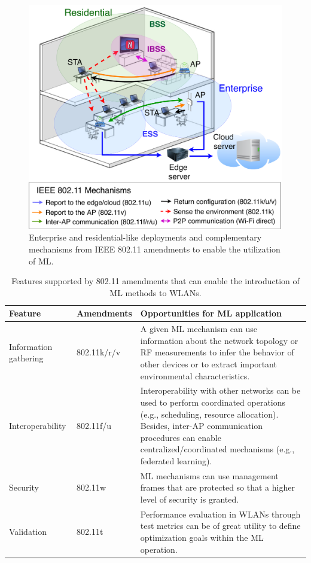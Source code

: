 \documentclass[journal]{IEEEtran}
\begin{document}
\begin{figure}[ht!]
	\centering
	\includegraphics[width=\columnwidth]{overview_learning_approaches}
	\caption{Enterprise and residential-like deployments and complementary mechanisms from IEEE 802.11 amendments to enable the utilization of ML.}
	\label{fig:overview_learning_approaches}
\end{figure}

\begin{table}[t!]
	\caption{Features supported by 802.11 amendments that can enable the introduction of ML methods to WLANs.}
	\label{tab:opportunities_amendments}
	\centering
	\begin{tabular}{|p{}|p{}|p{}|}
		\hline
		\textbf{Feature} & \textbf{Amendments} & \textbf{Opportunities for ML application} \\\hline
		Information gathering & 802.11k/r/v & A given ML mechanism can use information about the network topology or RF measurements to infer the behavior of other devices or to extract important environmental characteristics.\\\hline
		Interoperability & 802.11f/u & Interoperability with other networks can be used to perform coordinated operations (e.g., scheduling, resource allocation). Besides, inter-AP communication procedures can enable centralized/coordinated mechanisms (e.g., federated learning). \\\hline
		Security & 802.11w & ML mechanisms can use management frames that are protected so that a higher level of security is granted.\\\hline
		Validation & 802.11t & Performance evaluation in WLANs through test metrics can be of great utility to define optimization goals within the ML  operation.\\\hline
	\end{tabular}
\end{table}
\end{document}
